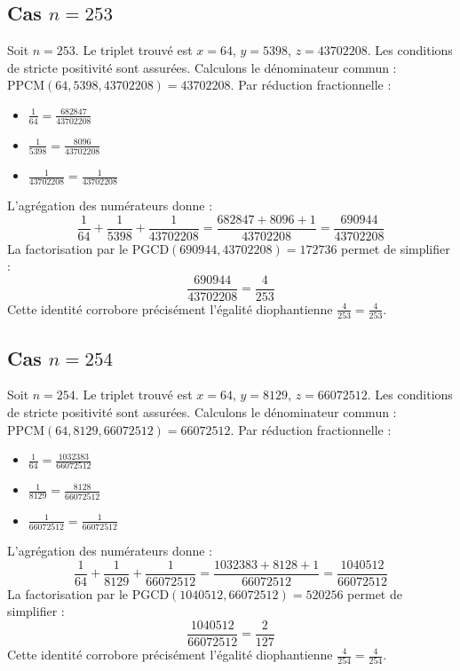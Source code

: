 \documentclass[11pt,a4paper]{article}
\begin{document}
\subsection{Cas $n = 253$}
Soit $n = 253$. Le triplet trouvé est $x = 64$, $y = 5398$, $z = 43702208$.
Les conditions de stricte positivité sont assurées.
Calculons le dénominateur commun : $\text{PPCM}(64, 5398, 43702208) = 43702208$.
Par réduction fractionnelle :
\begin{itemize}
    \item $\frac{1}{64} = \frac{682847}{43702208}$
    \item $\frac{1}{5398} = \frac{8096}{43702208}$
    \item $\frac{1}{43702208} = \frac{1}{43702208}$
\end{itemize}
L'agrégation des numérateurs donne :
$$ \frac{1}{64} + \frac{1}{5398} + \frac{1}{43702208} = \frac{682847 + 8096 + 1}{43702208} = \frac{690944}{43702208} $$
La factorisation par le $\text{PGCD}(690944, 43702208) = 172736$ permet de simplifier :
$$ \frac{690944}{43702208} = \frac{4}{253} $$
Cette identité corrobore précisément l'égalité diophantienne $\frac{4}{253} = \frac{4}{253}$.

\subsection{Cas $n = 254$}
Soit $n = 254$. Le triplet trouvé est $x = 64$, $y = 8129$, $z = 66072512$.
Les conditions de stricte positivité sont assurées.
Calculons le dénominateur commun : $\text{PPCM}(64, 8129, 66072512) = 66072512$.
Par réduction fractionnelle :
\begin{itemize}
    \item $\frac{1}{64} = \frac{1032383}{66072512}$
    \item $\frac{1}{8129} = \frac{8128}{66072512}$
    \item $\frac{1}{66072512} = \frac{1}{66072512}$
\end{itemize}
L'agrégation des numérateurs donne :
$$ \frac{1}{64} + \frac{1}{8129} + \frac{1}{66072512} = \frac{1032383 + 8128 + 1}{66072512} = \frac{1040512}{66072512} $$
La factorisation par le $\text{PGCD}(1040512, 66072512) = 520256$ permet de simplifier :
$$ \frac{1040512}{66072512} = \frac{2}{127} $$
Cette identité corrobore précisément l'égalité diophantienne $\frac{4}{254} = \frac{4}{254}$.
\end{document}
